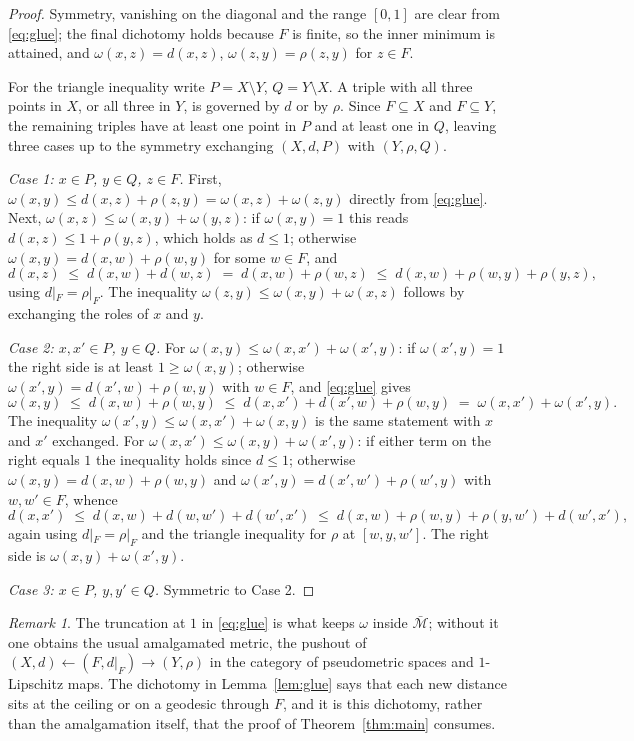 \documentclass[11pt]{article}
\theoremstyle{definition}
\theoremstyle{remark}
\newtheorem{remark}[theorem]{Remark}
\newcommand{\bM}{\bar{\mathcal{M}}}
\begin{document}
\begin{proof}
Symmetry, vanishing on the diagonal and the range $[0,1]$ are clear from
\eqref{eq:glue}; the final dichotomy holds because $F$ is finite, so the inner minimum is
attained, and $\omega(x,z)=d(x,z)$, $\omega(z,y)=\rho(z,y)$ for $z\in F$.

For the triangle inequality write $P=X\setminus Y$, $Q=Y\setminus X$. A triple with all
three points in $X$, or all three in $Y$, is governed by $d$ or by $\rho$. Since $F\subseteq
X$ and $F\subseteq Y$, the remaining triples have at least one point in $P$ and at least one
in $Q$, leaving three cases up to the symmetry exchanging $(X,d,P)$ with $(Y,\rho,Q)$.

\smallskip
\noindent\emph{Case 1: $x\in P$, $y\in Q$, $z\in F$.}
First, $\omega(x,y)\le d(x,z)+\rho(z,y)=\omega(x,z)+\omega(z,y)$ directly from
\eqref{eq:glue}. Next, $\omega(x,z)\le\omega(x,y)+\omega(y,z)$: if $\omega(x,y)=1$ this
reads $d(x,z)\le1+\rho(y,z)$, which holds as $d\le1$; otherwise
$\omega(x,y)=d(x,w)+\rho(w,y)$ for some $w\in F$, and
\[
d(x,z)\;\le\;d(x,w)+d(w,z)\;=\;d(x,w)+\rho(w,z)\;\le\;d(x,w)+\rho(w,y)+\rho(y,z),
\]
using $d|_F=\rho|_F$. The inequality $\omega(z,y)\le\omega(x,y)+\omega(x,z)$ follows by
exchanging the roles of $x$ and $y$.

\smallskip
\noindent\emph{Case 2: $x,x'\in P$, $y\in Q$.}
For $\omega(x,y)\le\omega(x,x')+\omega(x',y)$: if $\omega(x',y)=1$ the right side is at
least $1\ge\omega(x,y)$; otherwise $\omega(x',y)=d(x',w)+\rho(w,y)$ with $w\in F$, and
\eqref{eq:glue} gives
\[
\omega(x,y)\;\le\;d(x,w)+\rho(w,y)\;\le\;d(x,x')+d(x',w)+\rho(w,y)\;=\;\omega(x,x')+\omega(x',y).
\]
The inequality $\omega(x',y)\le\omega(x,x')+\omega(x,y)$ is the same statement with $x$ and
$x'$ exchanged. For $\omega(x,x')\le\omega(x,y)+\omega(x',y)$: if either term on the right equals $1$ the
inequality holds since $d\le1$; otherwise $\omega(x,y)=d(x,w)+\rho(w,y)$ and
$\omega(x',y)=d(x',w')+\rho(w',y)$ with $w,w'\in F$, whence
\[
d(x,x')\;\le\;d(x,w)+d(w,w')+d(w',x')\;\le\;d(x,w)+\rho(w,y)+\rho(y,w')+d(w',x'),
\]
again using $d|_F=\rho|_F$ and the triangle inequality for $\rho$ at $[w,y,w']$. The right
side is $\omega(x,y)+\omega(x',y)$.

\smallskip
\noindent\emph{Case 3: $x\in P$, $y,y'\in Q$.}
Symmetric to Case 2.
\end{proof}

\begin{remark}\label{rem:pushout}
The truncation at $1$ in \eqref{eq:glue} is what keeps $\omega$ inside $\bM$; without it
one obtains the usual amalgamated metric, the pushout of $(X,d)\leftarrow(F,d|_F)\to
(Y,\rho)$ in the category of pseudometric spaces and $1$-Lipschitz maps. The dichotomy in
Lemma~\ref{lem:glue} says that each new distance sits at the ceiling or on a geodesic
through $F$, and it is this dichotomy, rather than the amalgamation itself, that the proof
of Theorem~\ref{thm:main} consumes.
\end{remark}
\end{document}
